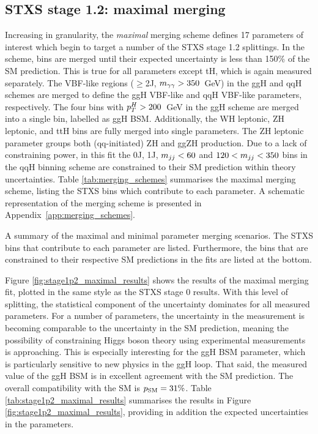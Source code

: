 \subsection{STXS stage 1.2: maximal merging}
Increasing in granularity, the \textit{maximal} merging scheme defines 17 parameters of interest which begin to target a number of the STXS stage 1.2 splittings. In the scheme, bins are merged until their expected uncertainty is less than 150\% of the SM prediction. This is true for all parameters except tH, which is again measured separately. The VBF-like regions ($\geq$2J, $m_{\gamma\gamma}>350$~GeV) in the ggH and qqH schemes are merged to define the ggH VBF-like and qqH VBF-like parameters, respectively. The four bins with $p_T^H>200$~GeV in the ggH scheme are merged into a single bin, labelled as ggH BSM. Additionally, the WH leptonic, ZH leptonic, and ttH bins are fully merged into single parameters. The ZH leptonic parameter groups both (qq-initiated) ZH and ggZH production. Due to a lack of constraining power, in this fit the 0J, 1J, $m_{jj}<60$ and $120<m_{jj}<350$ bins in the qqH binning scheme are constrained to their SM prediction within theory uncertainties. Table \ref{tab:merging_schemes} summarises the maximal merging scheme, listing the STXS bins which contribute to each parameter. A schematic representation of the merging scheme is presented in Appendix~\ref{app:merging_schemes}.

\begin{table}[htbp]
  \centering
  \scriptsize
  \renewcommand{\arraystretch}{1.2}
  \setlength{\tabcolsep}{2.2pt}
  \caption{
    A summary of the maximal and minimal parameter merging scenarios. 
    The STXS bins that contribute to each parameter are listed. 
    Furthermore, the bins that are constrained to their respective SM predictions 
    in the fits are listed at the bottom.
  }
  \label{tab:merging_schemes}
  
\end{table}

Figure \ref{fig:stage1p2_maximal_results} shows the results of the maximal merging fit, plotted in the same style as the STXS stage 0 results. With this level of splitting, the statistical component of the uncertainty dominates for all measured parameters. For a number of parameters, the uncertainty in the measurement is becoming comparable to the uncertainty in the SM prediction, meaning the possibility of constraining Higgs boson theory using experimental measurements is approaching. This is especially interesting for the ggH BSM parameter, which is particularly sensitive to new physics in the ggH loop. That said, the measured value of the ggH BSM \xsbr is in excellent agreement with the SM prediction. The overall compatibility with the SM is $p_{\rm{SM}}=31\%$. Table \ref{tab:stage1p2_maximal_results} summarises the results in Figure \ref{fig:stage1p2_maximal_results}, providing in addition the expected uncertainties in the parameters.

